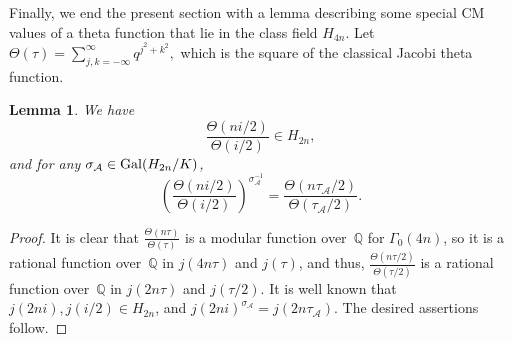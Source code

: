 \documentclass[11pt, reqno]{amsart}
\theoremstyle{plain}
\newtheorem{lemma}[theorem]{Lemma}
\theoremstyle{definition}
\numberwithin{equation}{section}
\begin{document}
  
    

Finally, we end the present section with a lemma describing
 some special CM values of a theta function that lie in the class field $H_{4n}$. Let     $
    \Theta(\tau)=\sum\limits_{j,k=-\infty}^{\infty}q^{j^{2}+k^{2}},%
    $
   which is the square of  the classical  Jacobi theta function. 

\begin{lemma}\label{thetagalois}
We have
    $$
\frac{\Theta(ni/2)}{\Theta(i/2)}\in H_{2n},
$$
and for any $\sigma_{\mathcal{A}}\in {\rm Gal}(H_{2n}/K)$,
$$
\left(\frac{\Theta(ni/2)}{\Theta(i/2)}\right)^{\sigma_{\mathcal{A}}^{-1}}=\frac{\Theta(n\tau_{\mathcal{A}}/2)}{\Theta(\tau_{\mathcal{A}}/2)}.
$$
\end{lemma}

\begin{proof}
    It is clear that $\frac{\Theta(n\tau)}{\Theta(\tau)}$ is a modular function over~$\mathbb{Q}$ for $\Gamma_{0}(4n)$, so it is a rational function over~$\mathbb{Q}$ in $j(4n\tau)$ and $j(\tau)$, and thus, $\frac{\Theta(n\tau/2)}{\Theta(\tau/2)}$ is a rational function over~$\mathbb{Q}$ in $j(2n\tau)$ and $j(\tau/2)$. It is well known that $j(2ni),j(i/2)\in H_{2n}$, and $j(2ni)^{\sigma_{\mathcal{A}}}=j(2n\tau_{\mathcal{A}})$. The desired assertions follow.
\end{proof}















    
\end{document}
